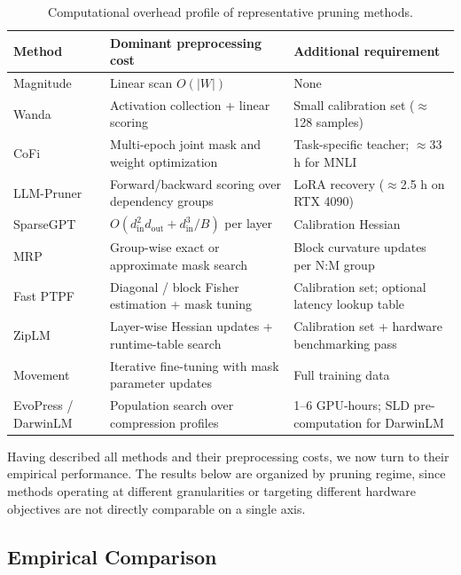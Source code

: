 \begin{table}[H]
	\centering
	\caption{Computational overhead profile of representative pruning methods.}
	\label{tab:unstructured_comparison}
	\begin{tabular}{@{}p{2.4cm}p{3.6cm}p{3.8cm}@{}}
		\toprule
		\textbf{Method} & \textbf{Dominant preprocessing cost} & \textbf{Additional requirement} \\ \midrule
		Magnitude \cite{han2015deep} & Linear scan $O(|W|)$ & None \\
		Wanda \cite{sun2023simple} & Activation collection + linear scoring & Small calibration set ($\approx$128 samples) \\
		CoFi \cite{xia2022structured} & Multi-epoch joint mask and weight optimization & Task-specific teacher; $\approx$33 h for MNLI \\
		LLM-Pruner \cite{ma2023llmpruner} & Forward/backward scoring over dependency groups & LoRA recovery ($\approx$2.5 h on RTX 4090) \\
		SparseGPT \cite{frantar2023sparsegpt} & $O(d_{\mathrm{in}}^2 d_{\mathrm{out}} + d_{\mathrm{in}}^3/B)$ per layer & Calibration Hessian \\
		MRP \cite{zhao2024pruning} & Group-wise exact or approximate mask search & Block curvature updates per N:M group \\
		Fast PTPF \cite{kwon2022fast} & Diagonal / block Fisher estimation + mask tuning & Calibration set; optional latency lookup table \\
		ZipLM \cite{kurtic2023ziplm} & Layer-wise Hessian updates + runtime-table search & Calibration set + hardware benchmarking pass \\
		Movement \cite{sanh2020movement} & Iterative fine-tuning with mask parameter updates & Full training data \\
		EvoPress / DarwinLM \cite{evopress2024,darwinlm2025} & Population search over compression profiles & 1--6 GPU-hours; SLD pre-computation for DarwinLM \\ \bottomrule
	\end{tabular}
\end{table}

Having described all methods and their preprocessing costs, we now turn to their empirical performance. The results below are organized by pruning regime, since methods operating at different granularities or targeting different hardware objectives are not directly comparable on a single axis.

\subsection{Empirical Comparison}


